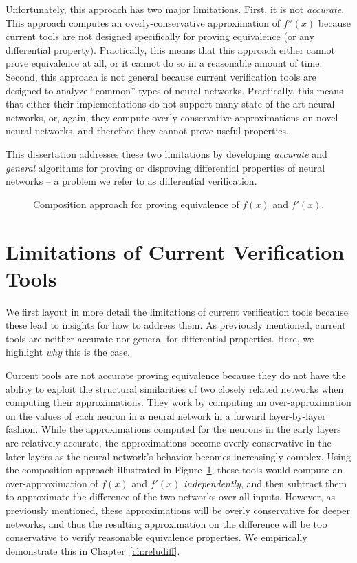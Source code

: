 Unfortunately, this approach has two major limitations. First, it is not
\textit{accurate}. This approach computes an overly-conservative approximation of
$ f''(x) $ because current tools are not designed specifically for proving
equivalence (or any differential property). Practically, this means that this
approach either cannot prove equivalence at all, or it cannot do so in a
reasonable amount of time. Second, this approach is not general because current
verification tools are designed to analyze ``common'' types of neural networks.
Practically, this means that either their implementations do not support many
state-of-the-art neural networks, or, again, they compute overly-conservative
approximations on novel neural networks, and therefore they cannot prove useful
properties.


This dissertation addresses these two limitations by developing \textit{accurate}
and \textit{general} algorithms for proving or disproving differential properties
of neural networks -- a problem we refer to as differential verification.

\begin{figure}
	\centering
	\scalebox{1.0}{}
	\caption{Composition approach for proving equivalence of $ f(x) $ and $ f'(x)
	$.}
	\label{fig:subbed_nnets_intro}
\end{figure}

\section{Limitations of Current Verification Tools}
We first layout in more detail the limitations of current verification tools
because these lead to insights for how to address them. As previously mentioned,
current tools are neither accurate nor general for differential properties. Here,
we highlight \textit{why} this is the case.

Current tools are not accurate proving equivalence because they do not have the
ability to exploit the structural similarities of two closely related
networks when computing their approximations. They work by computing an
over-approximation on the values of each neuron in a neural network in a forward
layer-by-layer fashion. While the approximations computed for the neurons in the
early layers are relatively accurate, the approximations become overly
conservative in the later layers as the neural network's behavior becomes
increasingly complex. Using the composition
approach illustrated in Figure~\ref{fig:subbed_nnets_intro}, these tools would
compute an
over-approximation of $ f(x) $ and $ f'(x) $  \textit{independently}, and then
subtract them to approximate the difference of the two networks over all inputs.
However, as previously mentioned, these approximations will be overly
conservative for deeper networks, and thus the resulting approximation on the
difference will be too conservative to verify reasonable equivalence properties.
We empirically demonstrate this in Chapter~\ref{ch:reludiff}.

